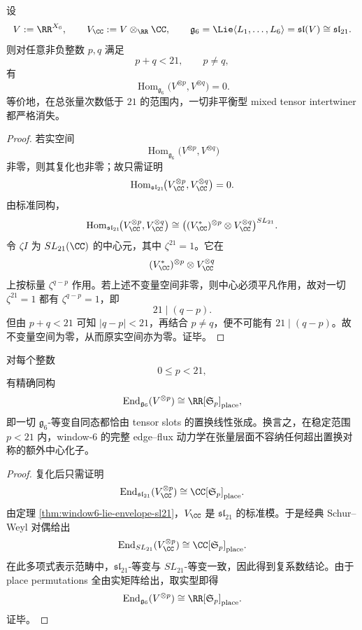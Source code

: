 \begin{theorem}\label{thm:conclusion-window6-subcritical-mixed-tensor-vacuum}
设
\[
V:=\RR^{X_6},
\qquad
V_{\CC}:=V\otimes_{\RR}\CC,
\qquad
\mathfrak g_6=\Lie\langle L_1,\dots,L_6\rangle=\mathfrak{sl}(V)\cong \mathfrak{sl}_{21}.
\]
则对任意非负整数 \(p,q\) 满足
\[
p+q<21,
\qquad
p\neq q,
\]
有
\[
\operatorname{Hom}_{\mathfrak g_6}\!\bigl(V^{\otimes p},V^{\otimes q}\bigr)=0.
\]
等价地，在总张量次数低于 \(21\) 的范围内，一切非平衡型 mixed tensor intertwiner 都严格消失。
\end{theorem}
\begin{proof}
若实空间
\[
\operatorname{Hom}_{\mathfrak g_6}\!\bigl(V^{\otimes p},V^{\otimes q}\bigr)
\]
非零，则其复化也非零；故只需证明
\[
\operatorname{Hom}_{\mathfrak{sl}_{21}}\!\bigl(V_{\CC}^{\otimes p},V_{\CC}^{\otimes q}\bigr)=0.
\]
由标准同构，
\[
\operatorname{Hom}_{\mathfrak{sl}_{21}}\!\bigl(V_{\CC}^{\otimes p},V_{\CC}^{\otimes q}\bigr)
\cong
\bigl((V_{\CC}^*)^{\otimes p}\otimes V_{\CC}^{\otimes q}\bigr)^{SL_{21}}.
\]
令 \(\zeta I\) 为 \(SL_{21}(\CC)\) 的中心元，其中 \(\zeta^{21}=1\)。它在
\[
(V_{\CC}^*)^{\otimes p}\otimes V_{\CC}^{\otimes q}
\]
上按标量 \(\zeta^{q-p}\) 作用。若上述不变量空间非零，则中心必须平凡作用，故对一切 \(\zeta^{21}=1\) 都有 \(\zeta^{q-p}=1\)，即
\[
21\mid (q-p).
\]
但由 \(p+q<21\) 可知 \(|q-p|<21\)，再结合 \(p\neq q\)，便不可能有 \(21\mid(q-p)\)。故不变量空间为零，从而原实空间亦为零。证毕。
\end{proof}

\begin{theorem}\label{thm:conclusion-window6-subcritical-schur-weyl-rigidity}
对每个整数
\[
0\le p<21,
\]
有精确同构
\[
\operatorname{End}_{\mathfrak g_6}(V^{\otimes p})
\cong
\RR[\mathfrak S_p]_{\mathrm{place}},
\]
即一切 \(\mathfrak g_6\)-等变自同态都恰由 tensor slots 的置换线性张成。换言之，在稳定范围 \(p<21\) 内，window-\(6\) 的完整 edge--flux 动力学在张量层面不容纳任何超出置换对称的额外中心化子。
\end{theorem}
\begin{proof}
复化后只需证明
\[
\operatorname{End}_{\mathfrak{sl}_{21}}(V_{\CC}^{\otimes p})
\cong
\CC[\mathfrak S_p]_{\mathrm{place}}.
\]
由定理 \ref{thm:window6-lie-envelope-sl21}，\(V_{\CC}\) 是 \(\mathfrak{sl}_{21}\) 的标准模。于是经典 Schur--Weyl 对偶给出
\[
\operatorname{End}_{SL_{21}}(V_{\CC}^{\otimes p})
\cong
\CC[\mathfrak S_p]_{\mathrm{place}}.
\]
在此多项式表示范畴中，\(\mathfrak{sl}_{21}\)-等变与 \(SL_{21}\)-等变一致，因此得到复系数结论。由于 place permutations 全由实矩阵给出，取实型即得
\[
\operatorname{End}_{\mathfrak g_6}(V^{\otimes p})
\cong
\RR[\mathfrak S_p]_{\mathrm{place}}.
\]
证毕。
\end{proof}

